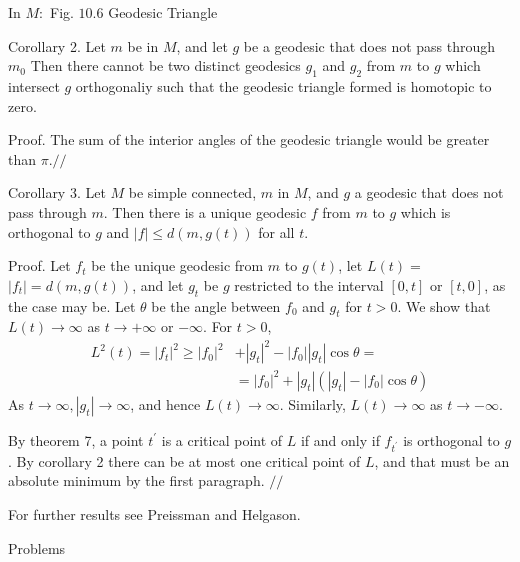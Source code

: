 \documentclass[10pt]{article}
\begin{document}
In $M:$ Fig. $10.6$ Geodesic Triangle

Corollary 2. Let $m$ be in $M$, and let $g$ be a geodesic that does not pass through $m_{0}$ Then there cannot be two distinct geodesics $g_{1}$ and $g_{2}$ from $m$ to $g$ which intersect $g$ orthogonaliy such that the geodesic triangle formed is homotopic to zero.

Proof. The sum of the interior angles of the geodesic triangle would be greater than $\pi . / /$

Corollary 3. Let $M$ be simple connected, $m$ in $M$, and $g$ a geodesic that does not pass through $m$. Then there is a unique geodesic $f$ from $m$ to $g$ which is orthogonal to $g$ and $|f| \leq d(m, g(t))$ for all $t$.

Proof. Let $f_{t}$ be the unique geodesic from $m$ to $g(t)$, let $L(t)=$ $\left|f_{t}\right|=d(m, g(t))$, and let $g_{t}$ be $g$ restricted to the interval $[0, t]$ or $[t, 0]$, as the case may be. Let $\theta$ be the angle between $f_{0}$ and $g_{t}$ for $t>0 .$ We show that $L(t) \rightarrow \infty$ as $t \rightarrow+\infty$ or $-\infty$. For $t>0$,
$$
\begin{aligned}
L^{2}(t)=\left|f_{t}\right|^{2} \geq\left|f_{0}\right|^{2} &+\left|g_{t}\right|^{2}-\left|f_{0}\right|\left|g_{t}\right| \cos \theta=\\
&=\left|f_{0}\right|^{2}+\left|g_{t}\right|\left(\left|g_{t}\right|-\left|f_{0}\right| \cos \theta\right)
\end{aligned}
$$
As $t \rightarrow \infty,\left|g_{t}\right| \rightarrow \infty$, and hence $L(t) \rightarrow \infty$. Similarly, $L(t) \rightarrow \infty$ as $t \rightarrow-\infty$.

By theorem 7, a point $t^{\prime}$ is a critical point of $L$ if and only if $f_{t^{\prime}}$ is orthogonal to $g$. By corollary 2 there can be at most one critical point of $L$, and that must be an absolute minimum by the first paragraph. $/ /$

For further results see Preissman and Helgason.

Problems
\end{document}
